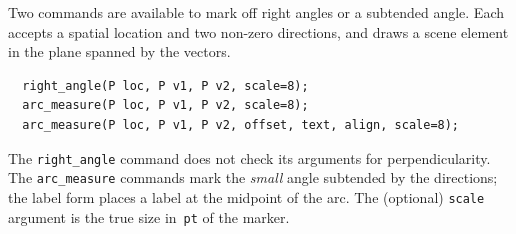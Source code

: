 \documentclass[12pt,letterpaper]{book}
\newcommand{\code}[1]{\texttt{#1}}
\newcommand{\ePiX}{\code{ePiX}}
\newcommand{\teximath}[1]{$#1$}
\newcommand{\findex}[1]{\ignorespaces}
\begin{document}
Two commands are available to mark off right angles or a subtended
angle. Each accepts a spatial location and two non-zero directions,
and draws a scene element in the plane spanned by the vectors.
\findex{right\_angle}
\findex{arc\_measure}
\begin{verbatim}
  right_angle(P loc, P v1, P v2, scale=8);
  arc_measure(P loc, P v1, P v2, scale=8);
  arc_measure(P loc, P v1, P v2, offset, text, align, scale=8);
\end{verbatim}
The \code{right\_angle} command does not check its arguments for
perpendicularity. The \code{arc\_measure} commands mark the
\emph{small} angle subtended by the directions; the label form places
a label at the midpoint of the arc. The (optional) \code{scale}
argument is the true size in~\code{pt} of the marker.

\end{document}
